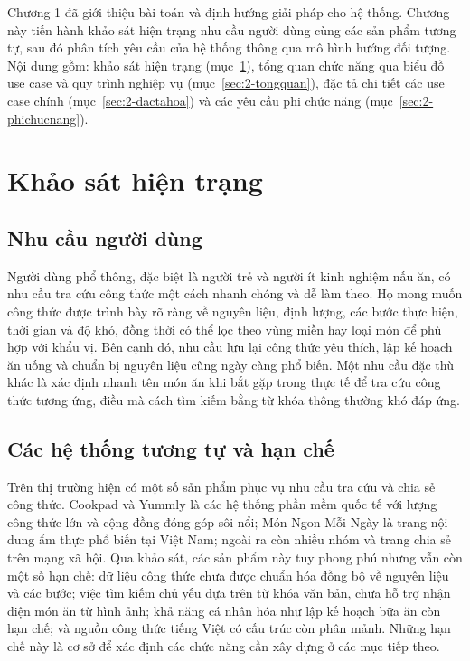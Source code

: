\documentclass[../DoAn.tex]{subfiles}
\begin{document}
Chương 1 đã giới thiệu bài toán và định hướng giải pháp cho hệ thống. Chương này tiến hành khảo sát hiện trạng nhu cầu người dùng cùng các sản phẩm tương tự, sau đó phân tích yêu cầu của hệ thống thông qua mô hình hướng đối tượng. Nội dung gồm: khảo sát hiện trạng (mục~\ref{sec:2-khaosat}), tổng quan chức năng qua biểu đồ use case và quy trình nghiệp vụ (mục~\ref{sec:2-tongquan}), đặc tả chi tiết các use case chính (mục~\ref{sec:2-dactahoa}) và các yêu cầu phi chức năng (mục~\ref{sec:2-phichucnang}).

\section{Khảo sát hiện trạng}
\label{sec:2-khaosat}

\subsection{Nhu cầu người dùng}
Người dùng phổ thông, đặc biệt là người trẻ và người ít kinh nghiệm nấu ăn, có nhu cầu tra cứu công thức một cách nhanh chóng và dễ làm theo. Họ mong muốn công thức được trình bày rõ ràng về nguyên liệu, định lượng, các bước thực hiện, thời gian và độ khó, đồng thời có thể lọc theo vùng miền hay loại món để phù hợp với khẩu vị. Bên cạnh đó, nhu cầu lưu lại công thức yêu thích, lập kế hoạch ăn uống và chuẩn bị nguyên liệu cũng ngày càng phổ biến. Một nhu cầu đặc thù khác là xác định nhanh tên món ăn khi bắt gặp trong thực tế để tra cứu công thức tương ứng, điều mà cách tìm kiếm bằng từ khóa thông thường khó đáp ứng.

\subsection{Các hệ thống tương tự và hạn chế}
Trên thị trường hiện có một số sản phẩm phục vụ nhu cầu tra cứu và chia sẻ công thức. Cookpad và Yummly là các hệ thống phần mềm quốc tế với lượng công thức lớn và cộng đồng đóng góp sôi nổi; Món Ngon Mỗi Ngày là trang nội dung ẩm thực phổ biến tại Việt Nam; ngoài ra còn nhiều nhóm và trang chia sẻ trên mạng xã hội. Qua khảo sát, các sản phẩm này tuy phong phú nhưng vẫn còn một số hạn chế: dữ liệu công thức chưa được chuẩn hóa đồng bộ về nguyên liệu và các bước; việc tìm kiếm chủ yếu dựa trên từ khóa văn bản, chưa hỗ trợ nhận diện món ăn từ hình ảnh; khả năng cá nhân hóa như lập kế hoạch bữa ăn còn hạn chế; và nguồn công thức tiếng Việt có cấu trúc còn phân mảnh. Những hạn chế này là cơ sở để xác định các chức năng cần xây dựng ở các mục tiếp theo.
\end{document}
